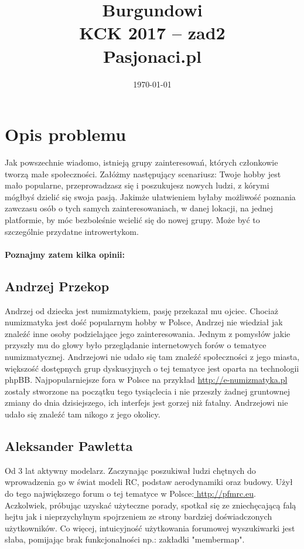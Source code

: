 \documentclass{article}
\title{Burgundowi\protect \\ \hfill \newline \newline KCK 2017 -- zad2\\ \newline\newline  Pasjonaci.pl\\ } %
\date{\today} %
\begin{document}
\maketitle  %
\thispagestyle{empty}
\newpage
\tableofcontents
\newpage

\section{Opis problemu}
  Jak powszechnie wiadomo, istnieją grupy zainteresowań, których członkowie tworzą małe społeczności. 
Załóżmy następujący scenariusz: Twoje hobby jest mało popularne, przeprowadzasz się i poszukujesz nowych ludzi, z kórymi mógłbyś dzielić się swoja pasją. Jakimże ułatwieniem byłaby możliwość poznania zawczasu osób o tych samych zainteresowaniach, w danej lokacji, na jednej platformie, by móc bezboleśnie wcielić się do nowej grupy. Może być to szczególnie przydatne introwertykom.\\ \\ \textbf{Poznajmy zatem kilka opinii:}

\subsection{Andrzej Przekop}
Andrzej od dziecka jest numizmatykiem, pasję przekazał mu ojciec. Chociaż numizmatyka jest dość popularnym hobby w Polsce, Andrzej nie wiedział jak znaleźć inne osoby podzielające jego zainteresowania. Jednym z pomysłów jakie przyszły mu do głowy było przeglądanie internetowych forów o tematyce numizmatycznej. Andrzejowi nie udało się tam znaleźć społeczności z jego miasta, większość dostępnych grup dyskusyjnych o tej tematyce jest oparta na technologii phpBB. Najpopularniejsze fora w Polsce na przykład \url{http://e-numizmatyka.pl} zostały stworzone na początku tego tysiąclecia i nie przeszły żadnej gruntownej zmiany do dnia dzisiejszego, ich interfejs jest gorzej niż fatalny. Andrzejowi nie udało się znaleźć tam nikogo z jego okolicy.
\newpage
\subsection{Aleksander Pawletta}
Od 3 lat aktywny modelarz. Zaczynając poszukiwał ludzi chętnych do wprowadzenia go w świat modeli RC, podstaw aerodynamiki oraz budowy. Użył do tego największego forum o tej tematyce w Polsce:\url{ http://pfmrc.eu}.  Aczkolwiek, próbując uzyskać użyteczne porady, spotkał się ze zniechęcającą falą hejtu jak i nieprzychylnym spojrzeniem ze strony bardziej doświadczonych użytkowników. Co więcej, intuicyjność użytkowania forumowej wyszukiwarki jest słaba, pomijając brak funkcjonalności np.: zakładki "membermap".
\end{document}
